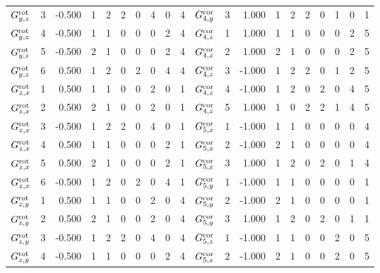 \begin{tabular}{crrrrrrrrrcrrrrrrrrr}
$ G^{\rm rot}_{  y  ,z  }  $&     3  & -0.500 & 1 & 2 & 2 & 0 & 4 & 0 & 4 &     $    G^{\rm cor}_{4, y}  $&  3  &  1.000 & 1 & 2 & 2 & 0 & 1 & 0 & 1\\
$ G^{\rm rot}_{  y  ,z  }  $&     4  & -0.500 & 1 & 1 & 0 & 0 & 0 & 2 & 4 &     $    G^{\rm cor}_{4, z}  $&  1  &  1.000 & 1 & 1 & 0 & 0 & 0 & 2 & 5\\
$ G^{\rm rot}_{  y  ,z  }  $&     5  & -0.500 & 2 & 1 & 0 & 0 & 0 & 2 & 4 &     $    G^{\rm cor}_{4, z}  $&  2  &  1.000 & 2 & 1 & 0 & 0 & 0 & 2 & 5\\
$ G^{\rm rot}_{  y  ,z  }  $&     6  &  0.500 & 1 & 2 & 0 & 2 & 0 & 4 & 4 &     $    G^{\rm cor}_{4, z}  $&  3  & -1.000 & 1 & 2 & 2 & 0 & 1 & 2 & 5\\
$ G^{\rm rot}_{  z  ,x  }  $&     1  &  0.500 & 1 & 1 & 0 & 0 & 2 & 0 & 1 &     $    G^{\rm cor}_{4, z}  $&  4  & -1.000 & 1 & 2 & 0 & 2 & 0 & 4 & 5\\
$ G^{\rm rot}_{  z  ,x  }  $&     2  &  0.500 & 2 & 1 & 0 & 0 & 2 & 0 & 1 &     $    G^{\rm cor}_{4, z}  $&  5  &  1.000 & 1 & 0 & 2 & 2 & 1 & 4 & 5\\
$ G^{\rm rot}_{  z  ,x  }  $&     3  & -0.500 & 1 & 2 & 2 & 0 & 4 & 0 & 1 &     $    G^{\rm cor}_{5, x}  $&  1  & -1.000 & 1 & 1 & 0 & 0 & 0 & 0 & 4\\
$ G^{\rm rot}_{  z  ,x  }  $&     4  &  0.500 & 1 & 1 & 0 & 0 & 0 & 2 & 1 &     $    G^{\rm cor}_{5, x}  $&  2  & -1.000 & 2 & 1 & 0 & 0 & 0 & 0 & 4\\
$ G^{\rm rot}_{  z  ,x  }  $&     5  &  0.500 & 2 & 1 & 0 & 0 & 0 & 2 & 1 &     $    G^{\rm cor}_{5, x}  $&  3  &  1.000 & 1 & 2 & 0 & 2 & 0 & 1 & 4\\
$ G^{\rm rot}_{  z  ,x  }  $&     6  & -0.500 & 1 & 2 & 0 & 2 & 0 & 4 & 1 &     $    G^{\rm cor}_{5, y}  $&  1  & -1.000 & 1 & 1 & 0 & 0 & 0 & 0 & 1\\
$ G^{\rm rot}_{  z  ,y  }  $&     1  &  0.500 & 1 & 1 & 0 & 0 & 2 & 0 & 4 &     $    G^{\rm cor}_{5, y}  $&  2  & -1.000 & 2 & 1 & 0 & 0 & 0 & 0 & 1\\
$ G^{\rm rot}_{  z  ,y  }  $&     2  &  0.500 & 2 & 1 & 0 & 0 & 2 & 0 & 4 &     $    G^{\rm cor}_{5, y}  $&  3  &  1.000 & 1 & 2 & 0 & 2 & 0 & 1 & 1\\
$ G^{\rm rot}_{  z  ,y  }  $&     3  & -0.500 & 1 & 2 & 2 & 0 & 4 & 0 & 4 &     $    G^{\rm cor}_{5, z}  $&  1  & -1.000 & 1 & 1 & 0 & 0 & 2 & 0 & 5\\
$ G^{\rm rot}_{  z  ,y  }  $&     4  & -0.500 & 1 & 1 & 0 & 0 & 0 & 2 & 4 &     $    G^{\rm cor}_{5, z}  $&  2  & -1.000 & 2 & 1 & 0 & 0 & 2 & 0 & 5\\

\end{tabular}

